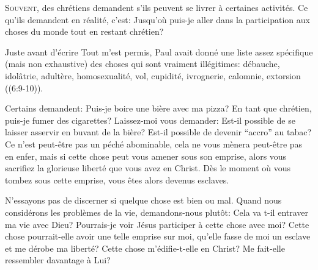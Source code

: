 \dvrule








\lettrine{S}{ouvent}, 
 des chrétiens demandent s'ils peuvent se livrer
 à certaines activités. Ce qu'ils demandent en réalité,
 c'est:
 \Og Jusqu'où puis-je aller dans la participation
 aux choses du monde tout en restant chrétien? \Fg{}

Juste avant d'écrire \Og Tout m'est permis, \Fg{}
 Paul avait donné une liste assez spécifique
 (mais non exhaustive) des choses qui sont vraiment illégitimes:
 débauche, idolâtrie, adultère, homosexualité,
 vol, cupidité, ivrognerie, calomnie, extorsion
 ((6:9-10)).


Certains demandent:
 \Og Puis-je boire une bière avec ma pizza?
 En tant que chrétien, puis-je fumer des cigarettes? \Fg{}
 Laissez-moi vous demander: 
 \Og Est-il possible de se laisser asservir en buvant de la bière?
 Est-il possible de devenir ``accro'' au tabac? \Fg{}
 Ce n'est peut-être pas un péché abominable,
 cela ne vous mènera peut-être pas en enfer,
 mais si cette chose peut vous amener sous son emprise,
 alors vous sacrifiez la glorieuse liberté que vous avez en Christ.
 Dès le moment où vous tombez sous cette emprise,
 vous êtes alors devenus esclaves.

N'essayons pas de discerner si quelque chose est bien ou mal.
 Quand nous considérons les problèmes de la vie,
 demandons-nous plutôt: \Og {}
 Cela va t-il entraver ma vie avec Dieu?
 Pourrais-je voir Jésus participer à cette chose avec moi?
 Cette chose pourrait-elle avoir une telle emprise sur moi,
 qu'elle fasse de moi un esclave et me dérobe ma liberté?
 Cette chose m'édifie-t-elle en Christ?
 Me fait-elle ressembler davantage à Lui? \Fg{}


